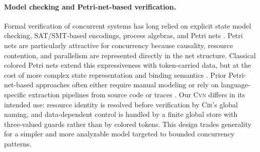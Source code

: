 \paragraph{Model checking and Petri-net-based verification.}
Formal verification of concurrent systems has long relied on explicit state model checking, SAT/SMT-based encodings, process algebras, and Petri nets \cite{Holzmann1997SPIN,Murata1989PetriNets,Esparza2008Unfoldings}. 
Petri nets are particularly attractive for concurrency because causality, resource contention, and parallelism are represented directly in the net structure. Classical colored Petri nets extend this expressiveness with token-carried data, but at the cost of more complex state representation and binding semantics \cite{Jensen2007CPNTools}. Prior Petri-net-based approaches often either require manual modeling or rely on language-specific extraction pipelines from source code or traces \cite{Esparza2002McMillan,Ball2002SLAM,Henzinger2003BLAST}. Our \textsc{Cvn} differs in its intended use: resource identity is resolved before verification by \textsc{Cir}'s global naming, and data-dependent control is handled by a finite global store with three-valued guards rather than by colored tokens. This design trades generality for a simpler and more analyzable model targeted to bounded concurrency patterns.

